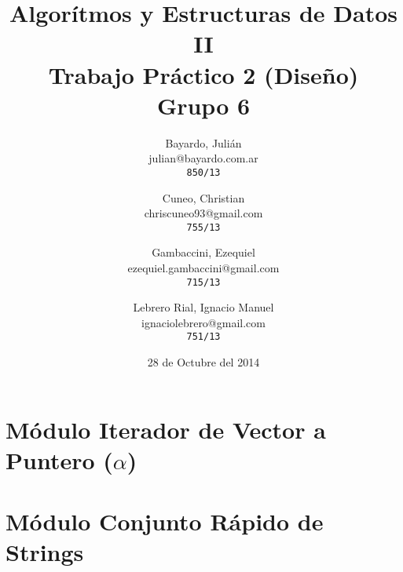 \documentclass[a4paper,titlepage]{article}
\begin{document}
\title{Algorítmos y Estructuras de Datos II\\
Trabajo Práctico 2 (Diseño)\\
Grupo 6}

\author{
  Bayardo, Julián\\
  julian@bayardo.com.ar\\
  \texttt{850/13}
  \and
  Cuneo, Christian\\
  chriscuneo93@gmail.com\\
  \texttt{755/13}
  \and
  Gambaccini, Ezequiel\\
  ezequiel.gambaccini@gmail.com\\
  \texttt{715/13}
  \and
  Lebrero Rial, Ignacio Manuel\\
  ignaciolebrero@gmail.com\\
  \texttt{751/13}
}

\date{28 de Octubre del 2014}

\maketitle


\section{Módulo Iterador de Vector a Puntero ($\alpha$)}



\section{Módulo Conjunto Rápido de Strings}



\end{document}
